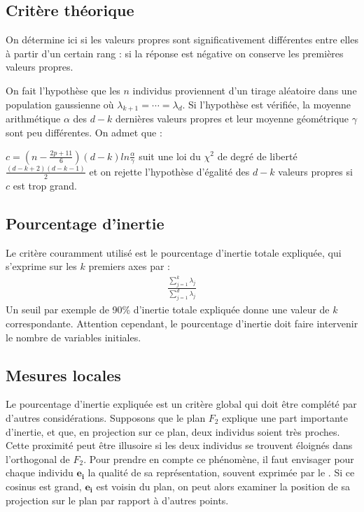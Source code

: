 \documentclass[letterpaper,10pt,english]{jupyterBook}
\begin{document}
\subsection{Critère théorique}
\label{\detokenize{acp:critere-theorique}}
\sphinxAtStartPar
On détermine ici si les valeurs propres sont significativement différentes entre elles à partir d’un certain rang : si la réponse est négative on conserve les
premières valeurs propres.

\sphinxAtStartPar
On fait l’hypothèse que les \(n\) individus proviennent d’un tirage aléatoire dans une population gaussienne  où \(\lambda_{k+1}=\cdots =\lambda_{d}\). Si l’hypothèse est vérifiée, la moyenne arithmétique \(\alpha\) des \(d-k\) dernières valeurs propres et leur moyenne géométrique \(\gamma\) sont peu différentes. On admet que :

\sphinxAtStartPar
\(c=\left ( n-\frac{2p+11}{6}\right )(d-k) ln\frac{\alpha}{\gamma}\)
suit une loi du \(\chi^2\) de degré de liberté \(\frac{(d-k+2)(d-k-1)}{2}\) et on rejette l’hypothèse d’égalité des \(d-k\) valeurs propres si \(c\) est trop grand.


\subsection{Pourcentage d’inertie}
\label{\detokenize{acp:pourcentage-d-inertie}}
\sphinxAtStartPar
Le critère couramment utilisé est le pourcentage d’inertie totale expliquée, qui s’exprime sur les \(k\) premiers axes par :
\begin{equation*}
\begin{split}\frac{\displaystyle\sum_{j=1}^k \lambda_j}{\displaystyle\sum_{j=1}^d \lambda_j}\end{split}
\end{equation*}
\sphinxAtStartPar
Un seuil par exemple de 90\% d’inertie totale expliquée donne une valeur de \(k\) correspondante. Attention cependant, le pourcentage d’inertie doit faire intervenir le nombre de variables initiales.

\sphinxAtStartPar
{}


\subsection{Mesures locales}
\label{\detokenize{acp:mesures-locales}}
\sphinxAtStartPar
Le pourcentage d’inertie expliquée est un critère global qui doit être complété par d’autres considérations. Supposons que le plan \(F_2\) explique une part importante d’inertie, et que, en projection sur ce plan, deux individus soient très proches. Cette proximité peut être illusoire si les deux individus se trouvent éloignés dans l’orthogonal de \(F_2\). Pour prendre en compte ce phénomène, il faut envisager pour chaque individu \(\mathbf{e_i}\) la qualité de sa représentation, souvent exprimée par le . Si ce cosinus est grand, \(\mathbf{e_i}\) est voisin du plan, on peut  alors examiner la position de sa projection sur le plan par rapport à d’autres points.
\end{document}
